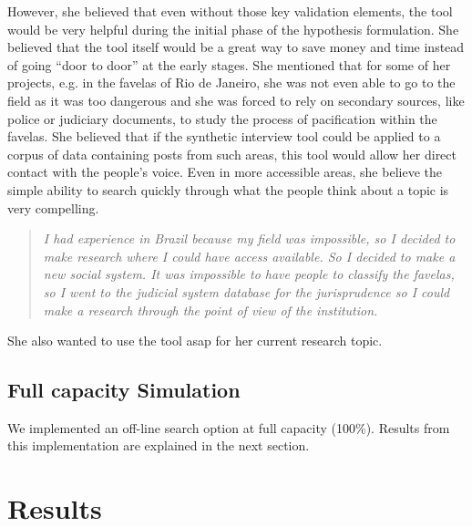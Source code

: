 \documentclass{sigchi}
\begin{document}
However, she believed that even without those key validation elements, the tool would be very helpful during the initial phase of the hypothesis formulation. She believed that the tool itself would be a great way to save money and time instead of going ``door to door'' at the early stages. She mentioned that for some of her projects, e.g. in the favelas of Rio de Janeiro, she was not even able to go to the field as it was too dangerous and she was forced to rely on secondary sources, like police or judiciary documents, to study the process of pacification within the favelas. She believed that if the synthetic interview tool could be applied to a corpus of data containing posts from such areas, this tool would allow her direct contact with the people's voice. Even in more accessible areas, she believe the simple ability to search quickly through what the people think about a topic is very compelling. 

\begin{quote}
{\em
I had experience in Brazil because my field was impossible, so I decided to make research where I could have access available. So I decided to make a new social system. It was impossible to have people to classify the favelas, so I went to the judicial system database for the jurisprudence so I could make a research through the point of view of the institution.
}\end{quote}

She also wanted to use the tool asap for her current research topic.

\subsection{Full capacity Simulation}
We implemented an off-line search option at full capacity (100\%). Results from this implementation are explained in the next section.



\section{Results}
\end{document}
